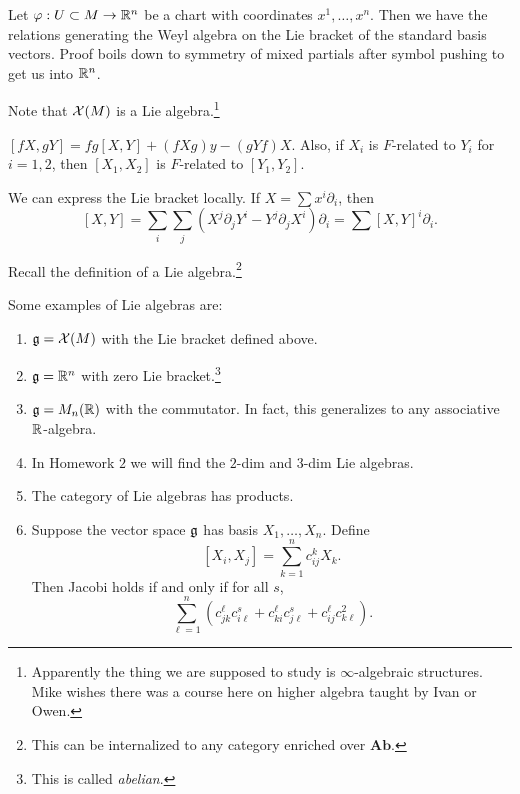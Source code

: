 \documentclass[twoside, 10pt]{article}
\begin{document}
    \begin{exm} Let $\varphi:U \subset M \to \mathbb{R}^n$ be a chart with coordinates
        $x^1, \ldots, x^n$. Then we have the relations generating the Weyl
        algebra on the Lie bracket of the standard basis vectors. Proof boils
        down to symmetry of mixed partials after symbol pushing to get us into
        $\mathbb{R}^n$.  \end{exm}

    Note that $\mathcal{X}(M)$ is a Lie algebra.\footnote{Apparently the thing we
    are supposed to study is $\infty$-algebraic structures. Mike wishes there
was a course here on higher algebra taught by Ivan or Owen.}

    \begin{prop} $[fX,gY] = fg[X,Y] + (fXg)y - (gYf)X$. Also, if $X_i$ is
    $F$-related to $Y_i$ for $i = 1,2$, then $[X_1,X_2]$ is $F$-related to
$[Y_1,Y_2]$.  \end{prop}

    We can express the Lie bracket locally. If $X = \sum x^i \partial_i$, then
    \[ [X,Y] = \sum_i \sum_j (X^j \partial_j Y^i - Y^j \partial_j X^i)
    \partial_i = \sum [X,Y]^i \partial_i.\]

    Recall the definition of a Lie algebra.\footnote{This can be internalized
    to any category enriched over $\mathbf{Ab}$.} 

    \begin{exm} Some examples of Lie algebras are: \begin{enumerate} \item
        $\mathfrak{g} = \mathcal{X}(M)$ with the Lie bracket defined above.  \item $\mathfrak{g}
        = \mathbb{R}^n$ with zero Lie bracket.\footnote{This is called
        \textit{abelian}.} \item $\mathfrak{g} = M_n(\mathbb{R})$ with the commutator. In
        fact, this generalizes to any associative $\mathbb{R}$-algebra.  \item In
        Homework $2$ we will find the $2$-dim and $3$-dim Lie algebras.  \item
        The category of Lie algebras has products.  \item Suppose the vector
        space $\mathfrak{g}$ has basis $X_1, \ldots, X_n$. Define \[ [X_i,X_j] =
            \sum_{k=1}^n c_{ij}^k X_k.\] Then Jacobi holds if and only if for
            all $s$, \[ \sum_{\ell = 1}^{n} (c_{jk}^{\ell}c_{i\ell}^s +
            c_{ki}^{\ell}c_{j\ell}^s + c_{ij}^{\ell}c_{k\ell}^2).\]
    \end{enumerate} \end{exm}
\end{document}
